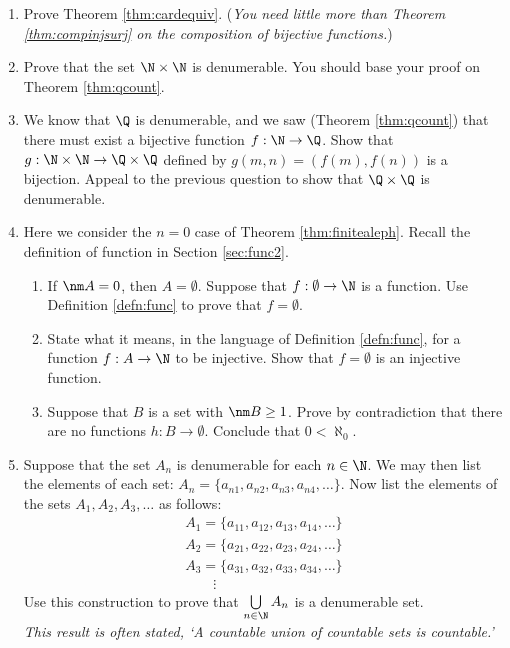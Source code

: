 \begin{exercises}{}{}
\begin{enumerate}
	\item Prove Theorem \ref{thm:cardequiv}. (\emph{You need little more than Theorem \ref{thm:compinjsurj} on the composition of bijective functions.})

	\item Prove that the set $\N\times\N$ is denumerable. You should base your proof on Theorem \ref{thm:qcount}.

	\item We know that $\Q$ is denumerable, and we saw (Theorem \ref{thm:qcount}) that there must exist a bijective function $f:\N\to\Q$. Show that $g:\N\times\N\to\Q\times\Q$ defined by $g(m,n)=(f(m),f(n))$ is a bijection. Appeal to the previous question to show that $\Q\times\Q$ is denumerable.
	
	\item Here we consider the $n=0$ case of Theorem \ref{thm:finitealeph}. Recall the definition of function in Section \ref{sec:func2}.
  \begin{enumerate}
    \item If $\nm A=0$, then $A=\emptyset$. Suppose that $f:\emptyset\to\N$ is a function. Use Definition \ref{defn:func} to prove that $f=\emptyset$.
    \item State what it means, in the language of Definition \ref{defn:func}, for a function $f:A\to\N$ to be injective. Show that $f=\emptyset$ is an injective function.
    \item Suppose that $B$ is a set with $\nm B\ge 1$. Prove by contradiction that there are no functions $h:B\to\emptyset$. Conclude that $0<\aleph_0$.
  \end{enumerate}

	\item\label{ex:cardunion} Suppose that the set $A_n$ is denumerable for each $n\in\N$. We may then list the elements of each set: $A_n=\{a_{n1},a_{n2},a_{n3},a_{n4},\ldots\}$. Now list the elements of the sets $A_1,A_2,A_3,\ldots$ as follows:
	\begin{gather*}
		A_1=\{a_{11},a_{12},a_{13},a_{14},\ldots\}\\
		A_2=\{a_{21},a_{22},a_{23},a_{24},\ldots\}\\
		A_3=\{a_{31},a_{32},a_{33},a_{34},\ldots\}\\
		\qquad\vdots
	\end{gather*}
	Use this construction to prove that $\bigcup\limits_{n\in\N}A_n$ is a denumerable set.\\
	\emph{This result is often stated, `A countable union of countable sets is countable.'}
	

\end{enumerate}
\end{exercises}
